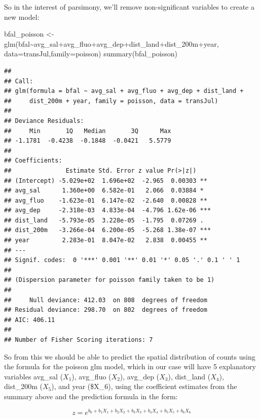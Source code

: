 \documentclass[
]{book}
\newenvironment{Shaded}{\begin{snugshade}}{\end{snugshade}}
\newcommand{\AttributeTok}[1]{\textcolor[rgb]{0.61,0.61,0.61}{#1}}
\newcommand{\FunctionTok}[1]{\textcolor[rgb]{0,0,0}{#1}}
\newcommand{\NormalTok}[1]{#1}
\newcommand{\OtherTok}[1]{\textcolor[rgb]{0.37,0.37,0.37}{#1}}
\newcommand{\SpecialCharTok}[1]{\textcolor[rgb]{0,0,0}{#1}}
\begin{document}
So in the interest of parsimony, we'll remove non-significant variables to create a new model:

\begin{Shaded}
\begin{Highlighting}[]
\NormalTok{bfal\_poisson }\OtherTok{\textless{}{-}} \FunctionTok{glm}\NormalTok{(bfal}\SpecialCharTok{\textasciitilde{}}\NormalTok{avg\_sal}\SpecialCharTok{+}\NormalTok{avg\_fluo}\SpecialCharTok{+}\NormalTok{avg\_dep}\SpecialCharTok{+}\NormalTok{dist\_land}\SpecialCharTok{+}\NormalTok{dist\_200m}\SpecialCharTok{+}\NormalTok{year, }\AttributeTok{data=}\NormalTok{transJul,}\AttributeTok{family=}\NormalTok{poisson)}
\FunctionTok{summary}\NormalTok{(bfal\_poisson)}
\end{Highlighting}
\end{Shaded}

\begin{verbatim}
## 
## Call:
## glm(formula = bfal ~ avg_sal + avg_fluo + avg_dep + dist_land + 
##     dist_200m + year, family = poisson, data = transJul)
## 
## Deviance Residuals: 
##     Min       1Q   Median       3Q      Max  
## -1.1781  -0.4238  -0.1848  -0.0421   5.5779  
## 
## Coefficients:
##               Estimate Std. Error z value Pr(>|z|)    
## (Intercept) -5.029e+02  1.696e+02  -2.965  0.00303 ** 
## avg_sal      1.360e+00  6.582e-01   2.066  0.03884 *  
## avg_fluo    -1.623e-01  6.147e-02  -2.640  0.00828 ** 
## avg_dep     -2.318e-03  4.833e-04  -4.796 1.62e-06 ***
## dist_land   -5.793e-05  3.228e-05  -1.795  0.07269 .  
## dist_200m   -3.266e-04  6.200e-05  -5.268 1.38e-07 ***
## year         2.283e-01  8.047e-02   2.838  0.00455 ** 
## ---
## Signif. codes:  0 '***' 0.001 '**' 0.01 '*' 0.05 '.' 0.1 ' ' 1
## 
## (Dispersion parameter for poisson family taken to be 1)
## 
##     Null deviance: 412.03  on 808  degrees of freedom
## Residual deviance: 298.70  on 802  degrees of freedom
## AIC: 406.11
## 
## Number of Fisher Scoring iterations: 7
\end{verbatim}

So from this we should be able to predict the spatial distribution of counts using the formula for the poisson glm model, which in our case will have 5 explanatory variables avg\_sal (\(X_1\)), avg\_fluo (\(X_2\)), avg\_dep (\(X_3\)), dist\_land (\(X_4\)), dist\_200m (\(X_5\)), and year (\$X\_6), using the coefficient estimates from the summary above and the prediction formula in the form:

\[z = e^{b_0+b_1X_1+b_2X_2+b_3X_3+b_4X_4+b_5X_5+b_6X_6}\]
\end{document}
